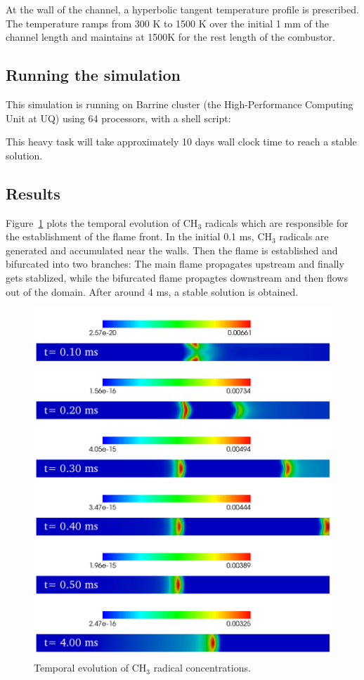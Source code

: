 At the wall of the channel, a hyperbolic tangent temperature profile is prescribed.
The temperature ramps from 300 K to 1500 K over the initial 1 mm of the channel length
and maintains at 1500K for the rest length of the combustor.\\
\noindent\topbar

\bottombar

\subsection{Running the simulation}
%
This simulation is running on Barrine cluster (the High-Performance Computing Unit at UQ)
using 64 processors, with a shell script:\\
\noindent\topbar

\bottombar

This heavy task will take approximately 10 days wall clock time to reach a stable solution.

\subsection{Results}
%
Figure~\ref{fig:CH3} plots the temporal evolution of CH$_3$ radicals which are responsible
for the establishment of the flame front. In the initial 0.1 ms, CH$_3$ radicals are generated
and accumulated near the walls. Then the flame is established and bifurcated into two branches:
The main flame propagates upstream and finally gets stablized, while the bifurcated flame propagtes
downstream and then flows out of the domain. After around 4 ms, a stable solution is obtained.

\begin{figure}[h]
\begin{center}
\includegraphics[width=15cm]{../2D/micro-combustion/CH3.png}
\caption{Temporal evolution of CH$_3$ radical concentrations.}
\label{fig:CH3}
\end{center}
\end{figure}
